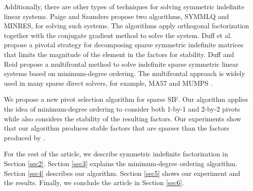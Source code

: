 \documentclass{article}
\begin{document}
Additionally, there are other types of techniques for solving symmetric indefinite linear systems.  Paige and Saunders \cite{SSIF1} propose two algorithms, SYMMLQ and MINRES, for solving such systems.  The algorithms apply orthogonal factorization together with the conjugate gradient method to solve the system.  Duff et al.\ \cite{SSIF2} propose a pivotal strategy for decomposing sparse symmetric indefinite matrices that limits the magnitude of the element in the factors for stability.
Duff and Reid \cite{MFrontal1} propose a multifrontal method to solve indefinite sparse symmetric linear systems based on minimum-degree ordering.
The multifrontal approach is widely used in many sparse direct solvers, for example, MA57 and MUMPS \cite{DS1, MA57}.

We propose a new pivot selection algorithm for sparse SIF.  Our algorithm applies the idea of minimum-degree ordering to consider both 1-by-1 and 2-by-2 pivots while also considers the stability of the resulting factors.  Our experiments show that our algorithm produces stable factors that are sparser than the factors produced by \cite{MA57}.

For the rest of the article, we describe symmetric indefinite factorization in Section \ref{sec2}.  Section \ref{sec3} explains the minimum-degree ordering algorithm.  Section \ref{sec4} describes our algorithm.  Section \ref{sec5} shows our experiment and the results.  Finally, we conclude the article in Section \ref{sec6}.
\end{document}
